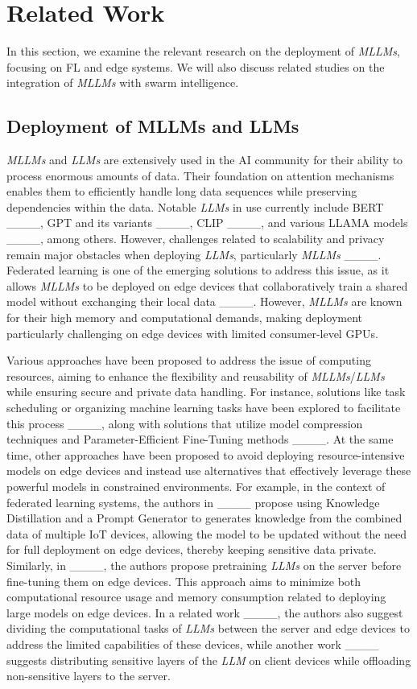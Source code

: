 \section{Related Work}
\label{section2}
In this section, we examine the relevant research on the deployment of \textit{MLLMs}, focusing on FL and edge systems. We will also discuss related studies on the integration of \textit{MLLMs} with swarm intelligence.

\subsection{Deployment of MLLMs and LLMs}
\textit{MLLMs} and \textit{LLMs} are extensively used in the AI community for their ability to process enormous amounts of data. Their foundation on attention mechanisms enables them to efficiently handle long data sequences while preserving dependencies within the data. Notable \textit{LLMs} in use currently include BERT ____, GPT and its variants ____, CLIP ____, and various LLAMA models ____, among others. However, challenges related to scalability and privacy remain major obstacles when deploying \textit{LLMs}, particularly \textit{MLLMs} ____. Federated learning is one of the emerging solutions to address this issue, as it allows \textit{MLLMs} to be deployed on edge devices that collaboratively train a shared model without exchanging their local data ____. However, \textit{MLLMs} are known for their high memory and computational demands, making deployment particularly challenging on edge devices with limited consumer-level GPUs. 

Various approaches have been proposed to address the issue of computing resources, aiming to enhance the flexibility and reusability of \textit{MLLMs}/\textit{LLMs} while ensuring secure and private data handling. For instance, solutions like task scheduling or organizing machine learning tasks have been explored to facilitate this process ____, along with solutions that utilize model compression techniques and Parameter-Efficient Fine-Tuning methods ____.
At the same time, other approaches have been proposed to avoid deploying resource-intensive models on edge devices and instead use alternatives that effectively leverage these powerful models in constrained environments. For example, in the context of federated learning systems, the authors in ____ propose using Knowledge Distillation and a Prompt Generator to generates knowledge from the combined data of multiple IoT devices, allowing the model to be updated without the need for full deployment on edge devices, thereby keeping sensitive data private. Similarly, in ____, the authors propose pretraining \textit{LLMs} on the server before fine-tuning them on edge devices. This approach aims to minimize both computational resource usage and memory consumption related to deploying large models on edge devices. In a related work ____, the authors also suggest dividing the computational tasks of \textit{LLMs} between the server and edge devices to address the limited capabilities of these devices, while another work ____ suggests distributing sensitive layers of the \textit{LLM} on client devices while offloading non-sensitive layers to the server.

